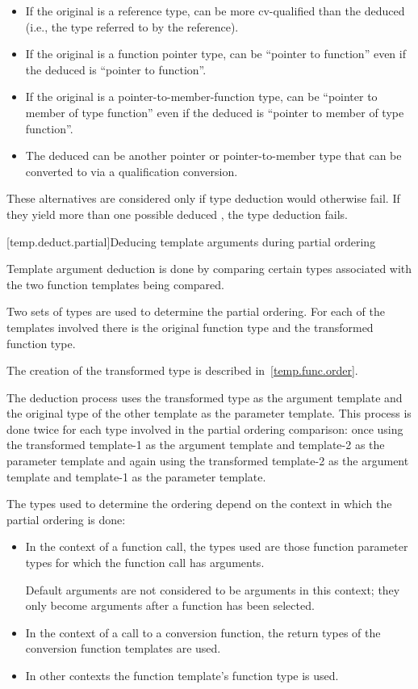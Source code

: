 \begin{itemize}
\item
If the original  is a reference type,
 can be more cv-qualified than the deduced 
(i.e., the type referred to by the reference).
\item
If the original  is a function pointer type,
 can be ``pointer to function''
even if the deduced  is ``pointer to  function''.
\item
If the original  is a pointer-to-member-function type,
 can be ``pointer to member of type function''
even if the deduced  is ``pointer to member of type  function''.
\item
The deduced 
can be another pointer or pointer-to-member type that
can be converted to  via a qualification conversion.
\end{itemize}

\pnum
These alternatives are considered only if type deduction would
otherwise fail.
If they yield more than one possible deduced
,
the type deduction fails.

[temp.deduct.partial]{Deducing template arguments during partial ordering}

\pnum
Template argument deduction is done by comparing certain types associated with
the two function templates being compared.

\pnum
Two sets of types are used to determine the partial ordering.  For each of
the templates involved there is the original function type and the
transformed function type.
\begin{note}
The creation of the transformed type is described in~\ref{temp.func.order}.
\end{note}
The deduction process uses the
transformed type as the argument template and the original type of the
other template as the parameter template.  This process is done twice
for each type involved in the partial ordering comparison: once using
the transformed template-1 as the argument template and template-2 as
the parameter template and again using the transformed template-2 as
the argument template and template-1 as the parameter template.

\pnum
The types used to determine the ordering depend on the context in which
the partial ordering is done:

\begin{itemize}
\item
In the context of a function call, the types used are those function parameter types
for which the function call has arguments.
\begin{footnote}
Default arguments
are not considered to be arguments in this context; they only become arguments
after a function has been selected.
\end{footnote}
\item
In the context of a call to a conversion function, the return types of
the conversion function templates are used.
\item
In other contexts the function template's function
type is used.
\end{itemize}


